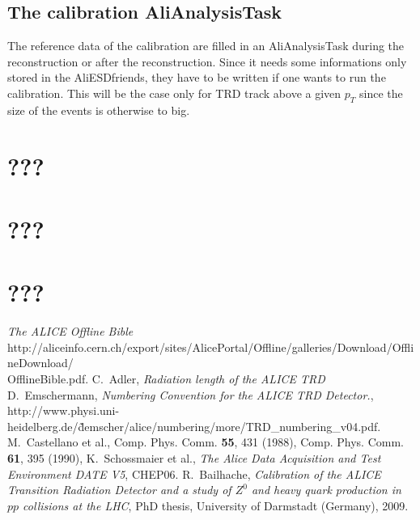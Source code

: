 \documentclass{alicetdr}
\begin{document}
\subsection{The calibration AliAnalysisTask}
The reference data of the calibration are filled in an AliAnalysisTask
during the reconstruction or after the reconstruction. Since it needs
some informations only stored in the AliESDfriends, they have to be
written if one wants to run the calibration. This will be the case
only for TRD track above a given $p_{T}$ since the size of the events
is otherwise to big.
%
\newpage
\setcounter{chapter}{4}
\setcounter{section}{0}
\thispagestyle{empty}
%
\section{???}
%
\newpage
\setcounter{chapter}{5}
\setcounter{section}{0}
\thispagestyle{empty}
%
\section{???}
%
\newpage
\setcounter{chapter}{6}
\setcounter{section}{0}
\thispagestyle{empty}
%
\section{???}
%
\newpage
\setcounter{chapter}{7}
\setcounter{section}{0}
\thispagestyle{empty}
%
\begin{thebibliography}{99}
%
  {\it The ALICE Offline Bible}\\
                   http://aliceinfo.cern.ch/export/sites/AlicePortal/Offline/galleries/Download/OfflineDownload/ \\
                   OfflineBible.pdf.
%
  C.~Adler,
                   {\it Radiation length of the ALICE TRD}
%
    D.~Emschermann,
                   {\it Numbering Convention for the ALICE TRD Detector.},
                   http://www.physi.uni-heidelberg.de/\~demscher/alice/numbering/more/TRD\_numbering\_v04.pdf.
%
   M.~Castellano et al.,
                   Comp. Phys. Comm. {\bf 55}, 431 (1988),
                   Comp. Phys. Comm. {\bf 61}, 395 (1990),
%
     K.~Schossmaier et al.,
                   {\it The Alice Data Acquisition and Test Environment DATE V5},
                   CHEP06.
%
  R.~Bailhache,
                   {\it Calibration of the ALICE Transition Radiation Detector
                   and a study of $Z^{0}$ and heavy quark production in $pp$
                   collisions at the LHC},
                   PhD thesis, University of Darmstadt (Germany), 2009.
%
\end{thebibliography}
%
%
\end{document}
